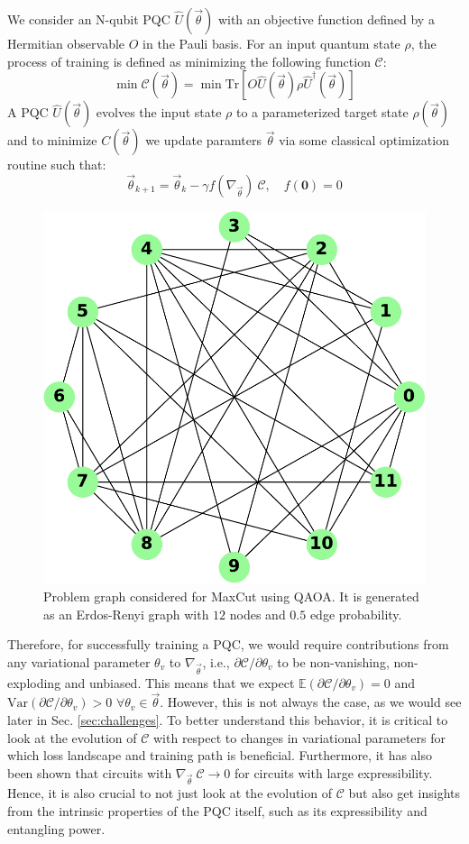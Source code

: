 We consider an N-qubit PQC $\hat{U}(\vec{\theta})$ with an objective function defined by a Hermitian observable $O$ in the Pauli basis. For an input quantum state $\rho$, the process of training is defined as minimizing the following function $\mathcal{C}$:
\begin{equation}
	\min \mathcal{C}(\vec{\theta}) = \min \text{Tr}[O \hat{U}(\vec{\theta}) \rho \hat{U}^{\dagger}(\vec{\theta})]
\end{equation}
A PQC $\hat{U}(\vec{\theta})$ evolves the input state $\rho$ to a parameterized target state $\rho(\vec{\theta})$ and to minimize $C(\vec{\theta})$ we update paramters $\vec{\theta}$ via some classical optimization routine such that:
\begin{equation}
	\vec{\theta}_{k+1} = \vec{\theta}_k - \gamma f(\nabla_{\vec{\theta}})\ \mathcal{C}, \quad f(\textbf{0})= 0 
\end{equation}
\begin{figure}[!tp]
    \centering
    \includegraphics[width=0.6\linewidth]{figures/qleet/qaoa-graph.pdf}
    \caption[Problem graph for QAOA]{Problem graph considered for MaxCut using QAOA. It is generated as an Erdos-Renyi graph with $12$ nodes and $0.5$ edge probability.}
    \label{fig:qoao-maxcut-graph}
\end{figure}
Therefore, for successfully training a PQC, we would require contributions from any variational parameter $\theta_v$ to $\nabla_{\vec{\theta}}$, i.e., $\partial\mathcal{C}/\partial\theta_v$ to be non-vanishing, non-exploding and unbiased. This means that we expect $\mathbb{E}(\partial\mathcal{C}/\partial\theta_v) = 0$ and $\text{Var}(\partial\mathcal{C}/\partial\theta_v) > 0$  $\forall \theta_v \in \vec{\theta}$. However, this is not always the case, as we would see later in Sec. \ref{sec:challenges}. To better understand this behavior, it is critical to look at the evolution of $\mathcal{C}$ with respect to changes in variational parameters for which loss landscape and training path is beneficial. Furthermore, it has also been shown that circuits with $\nabla_{\vec{\theta}}\ \mathcal{C} \rightarrow 0$ for circuits with large expressibility. Hence, it is also crucial to not just look at the evolution of $\mathcal{C}$ but also get insights from the intrinsic properties of the PQC itself, such as its expressibility and entangling power.

